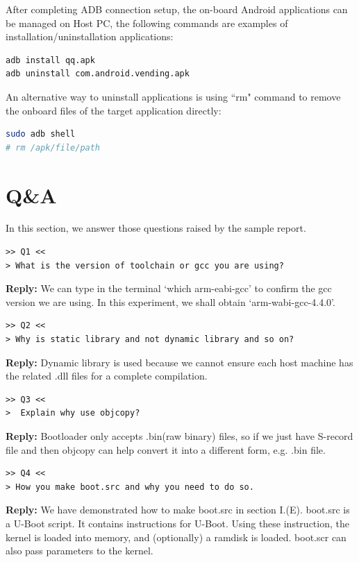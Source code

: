 \documentclass[10pt,journal,draftclsnofoot,onecolumn]{IEEEtran}
\begin{document}
After completing ADB connection setup, the on-board Android applications can be managed on Host PC, the following commands are examples of installation/uninstallation applications:
\begin{lstlisting}[language={bash}]
adb install qq.apk
adb uninstall com.android.vending.apk
\end{lstlisting}
An alternative way to uninstall applications is using ``rm" command to remove the onboard files of the target application directly:
\begin{lstlisting}[language={bash}]
sudo adb shell
# rm /apk/file/path
\end{lstlisting}

\section{Q\&A}\label{QA}
In this section, we answer those questions raised by the sample report.

\begin{verbatim}
>> Q1 <<
> What is the version of toolchain or gcc you are using?
\end{verbatim}
\textbf{Reply:} We can type in the terminal `which arm-eabi-gcc' to confirm the gcc version we are 
using. In this experiment, we shall obtain `arm-wabi-gcc-4.4.0'.

\begin{verbatim}
>> Q2 <<
> Why is static library and not dynamic library and so on?
\end{verbatim}
\textbf{Reply:} Dynamic library is used because we cannot ensure each host machine has 
the related .dll files for a complete compilation. 

\begin{verbatim}
>> Q3 <<
>  Explain why use objcopy?
\end{verbatim}
\textbf{Reply:} Bootloader only accepts .bin(raw binary) files, so if we just have S-record file and then 
objcopy can help convert it into a different form, e.g. .bin file.

\begin{verbatim}
>> Q4 <<
> How you make boot.src and why you need to do so.
\end{verbatim}
\textbf{Reply:} We have demonstrated how to make boot.src in section I.(E). 
boot.src is a U-Boot script. It contains instructions for U-Boot. Using these instruction, the kernel is loaded into memory, and (optionally) a ramdisk is loaded. boot.scr can also pass parameters to the kernel.
\end{document}
